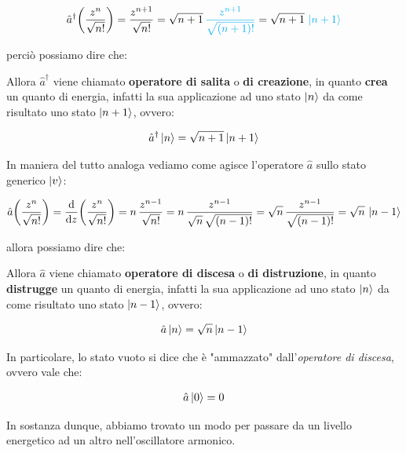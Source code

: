 \begin{align*}
	\hat{a}^{\dagger}\qty(\frac{z^n}{\sqrt{n!}}) = \frac{z^{n+1}}{\sqrt{n!}} = \sqrt{n+1} \, \textcolor{cyan}{ \frac{z^{n+1}}{\sqrt{\qty(n+1)!}} } = \sqrt{n+1} \, \, \textcolor{cyan}{\ket{n+1}}
\end{align*}

	perciò possiamo dire che:
	
\begin{mydef}
	Allora $\hat{a}^{\dagger}$ viene chiamato \textbf{operatore di salita} o \textbf{di creazione}, in quanto \textbf{crea} un quanto di energia, infatti la sua applicazione ad uno stato $\ket{n}$ da come risultato uno stato $\ket{n+1}$, ovvero:

\begin{align*}
	\hat{a}^{\dagger} \ket{n}= \sqrt{n+1} \ket{n+1}
\end{align*}
\end{mydef}

	In maniera del tutto analoga vediamo come agisce l'operatore $\hat{a}$ sullo stato generico $\ket{v}$:

\begin{align*}
	\hat{a} \qty(\frac{z^n}{\sqrt{n!}}) = \dv{z}\qty(\frac{z^n}{\sqrt{n!}}) = n \, \frac{z^{n-1}}{\sqrt{n!}} = n \, \frac{z^{n-1}}{\sqrt{n}\, \sqrt{\qty(n-1)!}}  = \sqrt{n} \, \frac{z^{n-1}}{\sqrt{\qty(n-1)!}} = \sqrt{n} \, \ket{n-1}
\end{align*}

	allora possiamo dire che:

\begin{mydef}
	Allora $\hat{a}$ viene chiamato \textbf{operatore di discesa} o \textbf{di distruzione}, in quanto \textbf{distrugge} un quanto di energia, infatti la sua applicazione ad uno stato $\ket{n}$ da come risultato uno stato $\ket{n-1}$, ovvero:

\begin{align*}
	\hat{a} \ket{n}= \sqrt{n} \ket{n-1}
\end{align*}
\end{mydef}

\begin{nb}
	In particolare, lo stato vuoto si dice che è "ammazzato" dall'\textit{operatore di discesa}, ovvero vale che:
	
\begin{align*}
	\hat{a} \ket{0} = 0
\end{align*}
\end{nb}

	In sostanza dunque, abbiamo trovato un modo per passare da un livello energetico ad un altro nell'oscillatore armonico.
	
